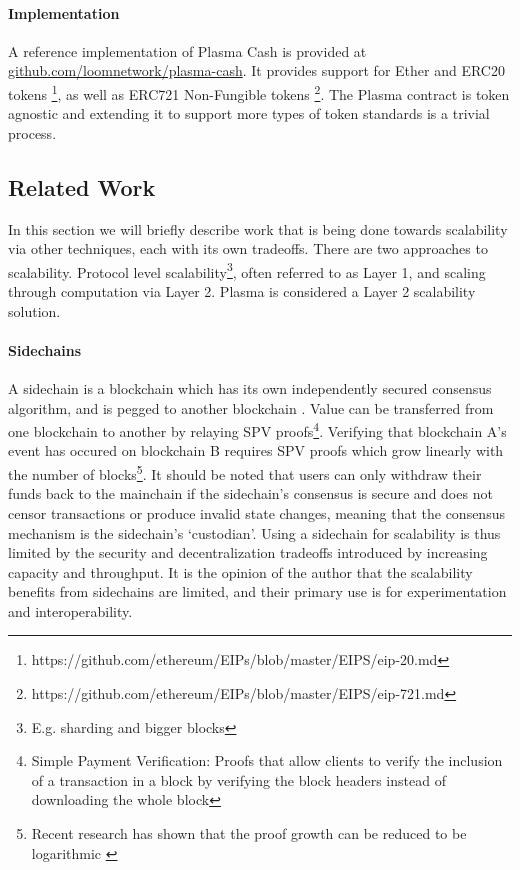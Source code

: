 \paragraph{Implementation} A reference implementation of Plasma Cash is
provided at \url{github.com/loomnetwork/plasma-cash}. It provides support for
Ether and ERC20 tokens
\footnote{https://github.com/ethereum/EIPs/blob/master/EIPS/eip-20.md}, 
as well as ERC721 Non-Fungible tokens
\footnote{https://github.com/ethereum/EIPs/blob/master/EIPS/eip-721.md}. 
The Plasma contract is token agnostic and extending it to support more types of
token standards is a trivial process.

\subsection{Related Work}

In this section we will briefly describe work that is being done towards scalability via other techniques, each with its own tradeoffs. 
There are two approaches to scalability. Protocol level scalability\footnote{E.g. sharding and bigger blocks}, often referred to as
Layer 1, and scaling through computation via Layer 2. Plasma is considered a Layer 2 scalability solution.

\paragraph{Sidechains} A sidechain is a blockchain which has its own independently secured consensus algorithm, and 
is pegged to another blockchain \cite{sidechains}. Value can be transferred 
    from one blockchain to another by relaying SPV proofs\footnote{Simple Payment Verification: Proofs that allow clients to verify the inclusion of a transaction in a block by verifying the block headers instead of downloading the whole block}. Verifying 
    that blockchain A's event has occured on blockchain B requires SPV proofs which grow linearly with the number of blocks\footnote{Recent research has shown that the proof growth can be reduced to be logarithmic \cite{nipopows}}. It should be noted that users can only withdraw their funds back to the mainchain if the sidechain's consensus is secure and does not censor transactions or produce invalid state changes, meaning that the consensus mechanism is the sidechain's `custodian'. Using a sidechain for scalability is thus limited by the security and decentralization tradeoffs introduced by increasing capacity and throughput. It is the opinion of the author that the scalability benefits from sidechains are limited, and their primary use is for experimentation and interoperability.

